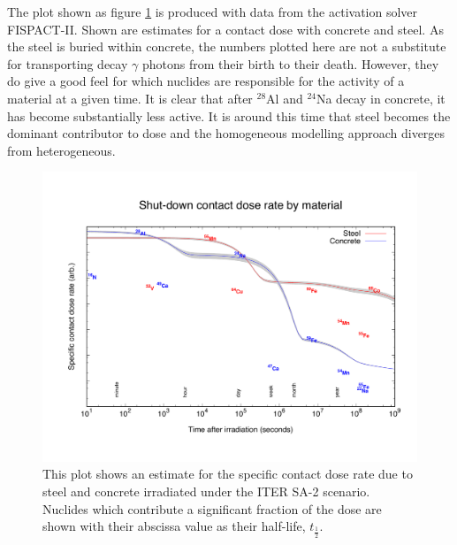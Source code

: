 The plot shown as figure \ref{fig:contact_dose} is produced with data from the activation solver FISPACT-II. Shown are estimates for a contact dose with concrete and steel. As the steel is buried within concrete, the numbers plotted here are not a substitute for transporting decay $\gamma$ photons from their birth to their death. However, they do give a good feel for which nuclides are responsible for the activity of a material at a given time. It is clear that after $^{28}$Al and $^{24}$Na decay in concrete, it has become substantially less active. It is around this time that steel becomes the dominant contributor to dose and the homogeneous modelling approach diverges from heterogeneous.

\begin{figure}[H]
  \includegraphics[width=\textwidth]{contact_dose_by_mat}
	\caption{This plot shows an estimate for the specific contact dose rate due to steel and concrete irradiated under the ITER SA-2 scenario. Nuclides which contribute a significant fraction of the dose are shown with their abscissa value as their half-life, $t_{\frac{1}{2}}$.}
	\label{fig:contact_dose}
\end{figure}



